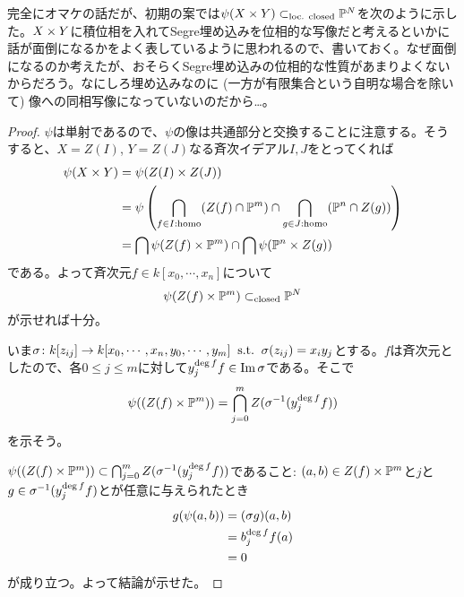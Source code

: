   \begin{rem}
    完全にオマケの話だが、初期の案では$\psi(X \times Y) \subset_{\text{loc. closed}} {\mathbb P}^N $を次のように示した。$X \times Y$に積位相を入れてSegre埋め込みを位相的な写像だと考えるといかに話が面倒になるかをよく表しているように思われるので、書いておく。なぜ面倒になるのか考えたが、おそらくSegre埋め込みの位相的な性質があまりよくないからだろう。なにしろ埋め込みなのに (一方が有限集合という自明な場合を除いて) 像への同相写像になっていないのだから…。
  \end{rem}


\begin{proof}
  $\psi $は単射であるので、$\psi $の像は共通部分と交換することに注意する。そうすると、$X = Z(I)$, $Y = Z(J)$なる斉次イデアル$I,J$をとってくれば
  \begin{align*}
    \psi (X \times Y) &= \psi (Z(I) \times Z(J)) \\
    &= \psi \left( \bigcap_{f \in I : \text{homo}} (Z(f) \cap {\mathbb P}^m)  \cap \bigcap_{g \in J : \text{homo}} ({\mathbb P}^n \cap Z(g)) \right) \\
    &= \bigcap \psi(Z(f) \times {\mathbb P}^m) \cap \bigcap \psi({\mathbb P}^n \times Z(g))
  \end{align*}
  である。よって斉次元$f \in k[x_0, \cdots , x_n]$について
  \[
  \psi(Z(f) \times {\mathbb P}^m) \subset_{\text{closed}} {\mathbb P}^N
  \]
  が示せれば十分。

  いま${\sigma} \colon k[z_{ij}]  \to k[x_0, \cdots , x_n, y_0, \cdots , y_m] \; \; \text{s.t.} \; \; {\sigma}(z_{ij}) = x_iy_j$とする。$f$は斉次元としたので、各$0 \leq j \leq m$に対して$y_j^{\deg f} f \in \operatorname{Im} {\sigma}$である。そこで
  \[
  \psi( (Z(f) \times {\mathbb P}^m) )= \bigcap_{j = 0}^m Z({\sigma}^{-1}(y_j^{\deg f}  f ) )
  \]
  を示そう。

  $\psi( (Z(f) \times {\mathbb P}^m) ) \subset  \bigcap_{j = 0}^m Z({\sigma}^{-1}(y_j^{\deg f}  f ) )$であること: $(a,b) \in Z(f) \times {\mathbb P}^m$と$j$と$g \in {\sigma}^{-1}(y_j^{\deg f}  f ) $とが任意に与えられたとき
  \begin{align*}
    g(\psi (a,b)) &= ({\sigma} g)(a,b) \\
    &= b_j^{\deg f} f(a)  \\
    &= 0
  \end{align*}
  が成り立つ。よって結論が示せた。


\end{proof}

